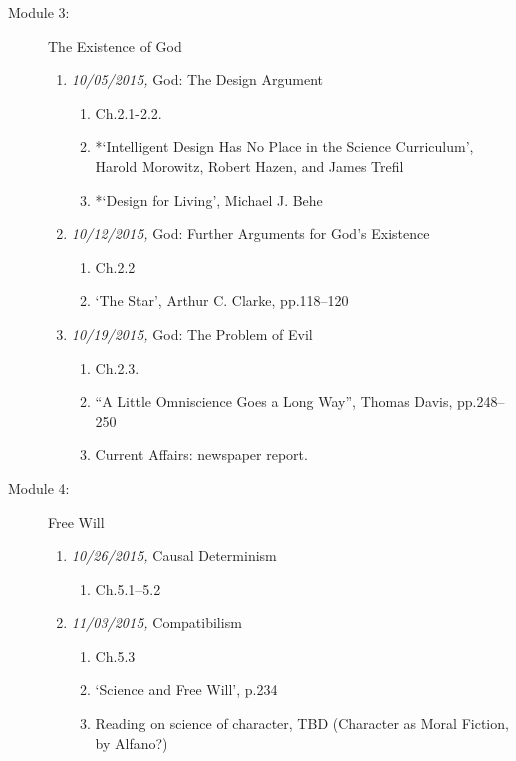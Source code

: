 \documentclass[11pt,article,oneside]{memoir}
\begin{document}
\begin{description}
\begin{enumerate}
\end{enumerate}

\item[Module 3: ] The Existence of God

\begin{enumerate}
\item \textit{10/05/2015,} God: The Design Argument
\begin{enumerate}
\item Ch.2.1-2.2. 
\item *`Intelligent Design Has No Place in the Science Curriculum', Harold Morowitz, Robert Hazen, and James Trefil
 \item *`Design for Living', Michael J. Behe
 \end{enumerate}
 
\item \textit{10/12/2015,} God: Further Arguments for God's Existence
\begin{enumerate}
\item Ch.2.2
\item `The Star', Arthur C. Clarke, pp.118--120
\end{enumerate}

\item \textit{10/19/2015,} God: The Problem of Evil 
\begin{enumerate}
\item Ch.2.3.
\item ``A Little Omniscience Goes a Long Way'', Thomas Davis, pp.248--250
\item Current Affairs: newspaper report. 
\end{enumerate}
\end{enumerate}

\item[Module 4:] Free Will

\begin{enumerate}
\item \textit{10/26/2015,}  Causal Determinism
\begin{enumerate}
\item Ch.5.1--5.2
\end{enumerate}

\item \textit{11/03/2015,} Compatibilism
\begin{enumerate}
\item Ch.5.3
\item `Science and Free Will', p.234
\item Reading on science of character, TBD (Character as Moral Fiction, by Alfano?)
\end{enumerate}


\end{enumerate}
\end{description}
\end{document}
